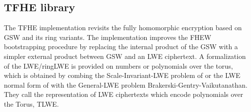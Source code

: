\subsection{TFHE library}
The TFHE implementation revisits the fully homomorphic encryption based on GSW and its ring variants. The implementation improves the FHEW bootstrapping procedure by replacing the internal product of the GSW with a simpler external product between GSW and an LWE ciphertext.
A formalization of the LWE/ringLWE is provided on numbers or polynomials over the torus, which is obtained by combing the Scale-Invariant-LWE problem of or the LWE normal form of with the General-LWE problem Brakerski-Gentry-Vaikutanathan\cite{chillotti2016faster}. They call the representation of LWE ciphertexts which encode polynomials over the Torus, TLWE.
